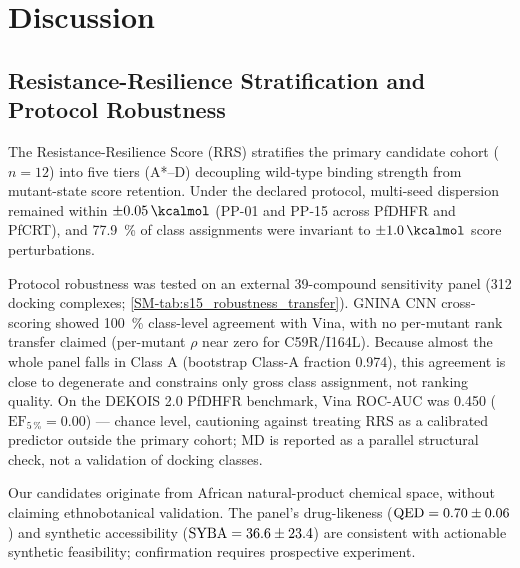 \documentclass[journal=jcisd8,manuscript=article,layout=traditional]{achemso}
\begin{document}

\section{Discussion}

\subsection{Resistance-Resilience Stratification and Protocol Robustness}

The Resistance-Resilience Score (RRS) stratifies the primary candidate cohort ($n=\num{12}$) into five tiers (A*--D) decoupling wild-type binding strength from mutant-state score retention. Under the declared protocol, multi-seed dispersion remained within $\pm\qty{0.05}{\kcalmol}$ (PP-01 and PP-15 across PfDHFR and PfCRT), and \qty{77.9}{\percent} of class assignments were invariant to $\pm\qty{1.0}{\kcalmol}$ score perturbations.

Protocol robustness was tested on an external 39-compound sensitivity panel (\num{312} docking complexes; \cref{SM-tab:s15_robustness_transfer}). GNINA CNN cross-scoring showed \qty{100}{\percent} class-level agreement with Vina, with no per-mutant rank transfer claimed (per-mutant $\rho$ near zero for C59R/I164L). Because almost the whole panel falls in Class A (bootstrap Class-A fraction \num{0.974}), this agreement is close to degenerate and constrains only gross class assignment, not ranking quality. On the DEKOIS 2.0 PfDHFR benchmark, Vina ROC-AUC was \num{0.450} ($\mathrm{EF}_{5\,\%} = \num{0.00}$) — chance level, cautioning against treating RRS as a calibrated predictor outside the primary cohort; MD is reported as a parallel structural check, not a validation of docking classes.

Our candidates originate from African natural-product chemical space, without claiming ethnobotanical validation. The panel's drug-likeness ($\mathrm{QED} = \num{0.70 \pm 0.06}$) and synthetic accessibility ($\mathrm{SYBA} = \num{36.6 \pm 23.4}$) are consistent with actionable synthetic feasibility; confirmation requires prospective experiment.
\end{document}
